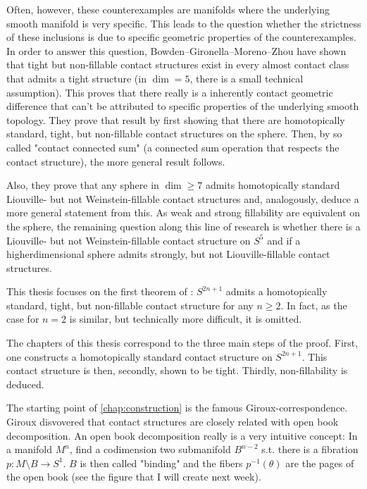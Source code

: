 Often, however, these counterexamples are manifolds where the underlying smooth manifold is very specific.
This leads to the question whether the strictness of these inclusions is due to specific geometric properties of the counterexamples.
In order to answer this question, Bowden--Gironella--Moreno--Zhou \cite{BGMZ22} have shown that tight but
non-fillable contact structures exist in every almost contact class that admits a tight structure (in $\dim = 5$, there is a small technical assumption).
This proves that there really is a inherently contact geometric difference 
that can't be attributed to specific properties of the underlying smooth topology.
They prove that result by first showing that there are homotopically standard, tight, but non-fillable contact structures on the sphere.
Then, by so called "contact connected sum" (a connected sum operation that respects the contact structure),
the more general result follows.

Also, they prove that any sphere in $\dim \geq 7$ admits homotopically standard Liouville- but not Weinstein-fillable contact structures
and, analogously, deduce a more general statement from this.
As weak and strong fillability are equivalent on the sphere, the remaining question along this line of research is
whether there is a Liouville- but not Weinstein-fillable contact structure on $S^5$ and if
a higherdimensional sphere admits strongly, but not Liouville-fillable contact structures.

This thesis focuses on the first theorem of \cite{BGMZ22}: $S^{2n+1}$ admits a homotopically standard, tight, but non-fillable contact structure
for any $n \geq 2$. In fact, as the case for $n = 2$ is similar, but technically more difficult, it is omitted.

The chapters of this thesis correspond to the three main steps of the proof. First, one constructs a homotopically standard contact structure on $S^{2n+1}$.
This contact structure is then, secondly, shown to be tight.
Thirdly, non-fillability is deduced.

The starting point of \cref{chap:construction} is the famous Giroux-correspondence.
Giroux disvovered that contact structures are closely related with open book decomposition.
An open book decomposition really is a very intuitive concept: In a manifold $M^n$, find a codimension two submanifold $B^{n-2}$
s.t. there is a fibration $p\colon M\setminus B \to S^1$. $B$ is then called "binding" and the fibers $p^{-1}(\theta)$ are the pages of the open book
(see the figure that I will create next week).

